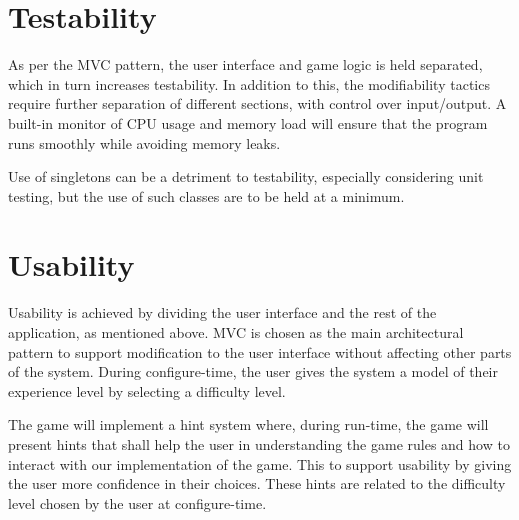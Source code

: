     \section{Testability}
    \label{test}
    As per the MVC pattern, the user interface and game logic is held separated, which in turn increases testability. In addition to this, the modifiability tactics require further separation of different sections, with control over input/output. A built-in monitor of CPU usage and memory load will ensure that the program runs smoothly while avoiding memory leaks.
    
    Use of singletons can be a detriment to testability, especially considering unit testing\cite{online:msdn_singleton}, but the use of such classes are to be held at a minimum.

    \section{Usability}
    Usability is achieved by dividing the user interface and the rest of the application, as mentioned above. MVC is chosen as the main architectural pattern to support modification to the user interface without affecting other parts of the system. During configure-time, the user gives the system a model of their experience level by selecting a difficulty level.
    
    The game will implement a hint system where, during run-time, the game will present hints that shall help the user in understanding the game rules and how to interact with our implementation of the game. This to support usability by giving the user more confidence in their choices.  These hints are related to the difficulty level chosen by the user at configure-time.
    
